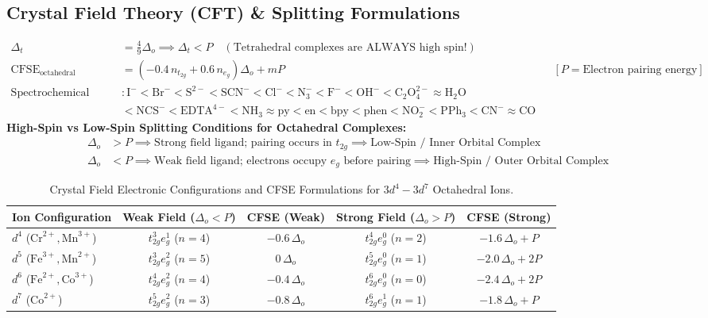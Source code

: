 \documentclass[11pt,a4paper]{article}
\begin{document}
\subsection{Crystal Field Theory (CFT) \& Splitting Formulations}

\begin{formulabox}
\begin{align}
  \Delta_t &= \frac{4}{9}\Delta_o \implies \Delta_t < P \quad (\text{Tetrahedral complexes are ALWAYS high spin!}) \\
  \text{CFSE}_{\text{octahedral}} &= \left(-0.4\,n_{t_{2g}} + 0.6\,n_{e_g}\right)\Delta_o + m P && [P = \text{Electron pairing energy}] \\
  \text{Spectrochemical Series} &: \text{I}^- < \text{Br}^- < \text{S}^{2-} < \text{SCN}^- < \text{Cl}^- < \text{N}_3^- < \text{F}^- < \text{OH}^- < \text{C}_2\text{O}_4^{2-} \approx \text{H}_2\text{O} \\
  &< \text{NCS}^- < \text{EDTA}^{4-} < \text{NH}_3 \approx \text{py} < \text{en} < \text{bpy} < \text{phen} < \text{NO}_2^- < \text{PPh}_3 < \text{CN}^- \approx \text{CO}
\end{align}
\textbf{High-Spin vs Low-Spin Splitting Conditions for Octahedral Complexes:}
\begin{align}
  \Delta_o &> P \implies \text{Strong field ligand; pairing occurs in } t_{2g} \implies \text{Low-Spin / Inner Orbital Complex} \\
  \Delta_o &< P \implies \text{Weak field ligand; electrons occupy } e_g \text{ before pairing} \implies \text{High-Spin / Outer Orbital Complex}
\end{align}
\end{formulabox}

\begin{table}[htbp]
\centering
\small
\renewcommand{\arraystretch}{1.2}
\begin{tabularx}{\textwidth}{L c c c c}
\toprule
\textbf{Ion Configuration} & \textbf{Weak Field ($\Delta_o < P$)} & \textbf{CFSE (Weak)} & \textbf{Strong Field ($\Delta_o > P$)} & \textbf{CFSE (Strong)} \\
\midrule
$d^4$ ($\text{Cr}^{2+}, \text{Mn}^{3+}$) & $t_{2g}^3 e_g^1$ ($n=4$) & $-0.6\,\Delta_o$ & $t_{2g}^4 e_g^0$ ($n=2$) & $-1.6\,\Delta_o + P$ \\
$d^5$ ($\text{Fe}^{3+}, \text{Mn}^{2+}$) & $t_{2g}^3 e_g^2$ ($n=5$) & $0\,\Delta_o$ & $t_{2g}^5 e_g^0$ ($n=1$) & $-2.0\,\Delta_o + 2P$ \\
$d^6$ ($\text{Fe}^{2+}, \text{Co}^{3+}$) & $t_{2g}^4 e_g^2$ ($n=4$) & $-0.4\,\Delta_o$ & $t_{2g}^6 e_g^0$ ($n=0$) & $-2.4\,\Delta_o + 2P$ \\
$d^7$ ($\text{Co}^{2+}$) & $t_{2g}^5 e_g^2$ ($n=3$) & $-0.8\,\Delta_o$ & $t_{2g}^6 e_g^1$ ($n=1$) & $-1.8\,\Delta_o + P$ \\
\bottomrule
\end{tabularx}
\caption{Crystal Field Electronic Configurations and CFSE Formulations for $3d^4 - 3d^7$ Octahedral Ions.}
\end{table}
\end{document}
